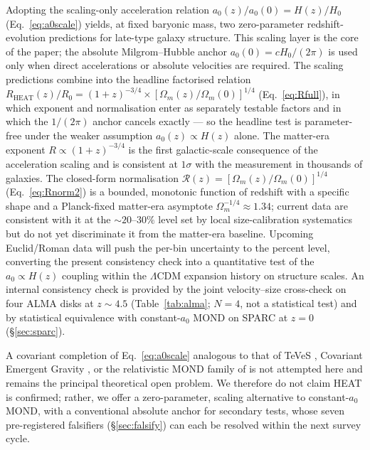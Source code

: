 \documentclass[twocolumn,letterpaper]{aastex631}
\newcommand{\azero}{a_0}
\newcommand{\lcdm}{\Lambda\mathrm{CDM}}
\newcommand{\heat}{\mathrm{HEAT}}
\begin{document}
Adopting the scaling-only acceleration relation
$\azero(z)/\azero(0)=H(z)/H_0$ (Eq.~\ref{eq:a0scale}) yields, at
fixed baryonic mass, two zero-parameter redshift-evolution
predictions for late-type galaxy structure.  This scaling layer is
the core of the paper; the absolute Milgrom--Hubble anchor
$\azero(0)=cH_0/(2\pi)$ is used only when direct accelerations or
absolute velocities are required.  The scaling predictions combine
into the headline factorised
relation
$R_{\heat}(z)/R_{0}=(1+z)^{-3/4}\times[\Omega_{m}(z)/\Omega_{m}(0)]^{1/4}$
(Eq.~\ref{eq:Rfull}), in which exponent and normalisation enter
as separately testable factors and in which the $1/(2\pi)$
anchor cancels exactly --- so the headline test is
parameter-free under the weaker assumption
$\azero(z)\propto H(z)$ alone.  The matter-era exponent
$R\propto(1+z)^{-3/4}$ is the first galactic-scale consequence of
the acceleration scaling and is consistent at $1\sigma$
with the \citet{vanderWel2014} measurement in thousands of
galaxies.  The closed-form normalisation
$\mathcal{R}(z)=[\Omega_{m}(z)/\Omega_{m}(0)]^{1/4}$
(Eq.~\ref{eq:Rnorm2}) is a bounded, monotonic function of
redshift with a specific shape and a Planck-fixed matter-era
asymptote $\Omega_{m}^{-1/4}\!\approx\!1.34$; current data are
consistent with it at the $\sim 20$--$30\%$ level set by local
size-calibration systematics but do not yet discriminate it
from the matter-era baseline.  Upcoming Euclid/Roman data
will push the per-bin uncertainty to the percent level,
converting the present consistency check into a quantitative
test of the $\azero\propto H(z)$ coupling within the $\lcdm$
expansion history on structure scales.  An internal consistency
check is provided by the joint velocity--size cross-check on
four ALMA disks at $z\!\sim\!4.5$ (Table~\ref{tab:alma};
$N\!=\!4$, not a statistical test) and by statistical
equivalence with constant-$\azero$ MOND on SPARC at $z=0$
(\S\ref{sec:sparc}).

A covariant completion of Eq.~\ref{eq:a0scale} analogous to that of
TeVeS \citep{Bekenstein2004}, Covariant Emergent Gravity
\citep{Hossenfelder2017}, or the relativistic MOND family of
\citet{Skordis2021} is not attempted here and remains the
principal theoretical open problem.  We therefore do not
claim HEAT is confirmed; rather, we offer a zero-parameter,
scaling alternative to constant-$\azero$ MOND, with a conventional
absolute anchor for secondary tests, whose seven pre-registered
falsifiers (\S\ref{sec:falsify})
can each be resolved within the next survey cycle.
\end{document}
